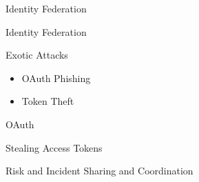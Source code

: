 \documentclass[nobackground,dvipsnames,table]{beamer}
\begin{document}
\begin{frame}{}
    
\end{frame}

\begin{frame}{}
    
\end{frame}

\begin{frame}{Identity Federation}
    
\end{frame}

\begin{frame}{Identity Federation}
    
\end{frame}

\begin{frame}{}
    
\end{frame}

\begin{frame}{Exotic Attacks}
    \begin{itemize}
        \item OAuth Phishing
        \item Token Theft
    \end{itemize}
\end{frame}

\begin{frame}{OAuth}
    
\end{frame}

\begin{frame}{}
    
\end{frame}

\begin{frame}{}
    
\end{frame}

\begin{frame}{Stealing Access Tokens}
    
\end{frame}

\begin{frame}{}
    
\end{frame}

\begin{frame}{Risk and Incident Sharing and Coordination}
    
\end{frame}
\end{document}

